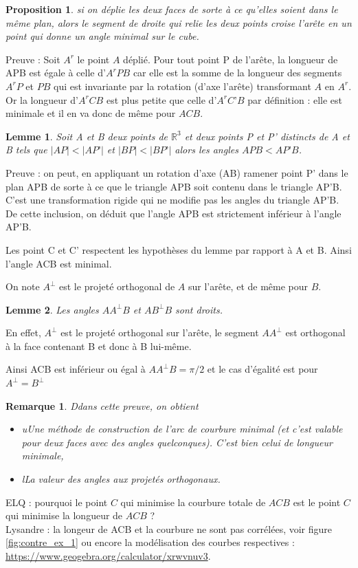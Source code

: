 \documentclass{article}
\newtheorem{prop}{Proposition}
\newtheorem{lem}{Lemme}
\newtheorem{rem}{Remarque}
\begin{document}
\begin{prop}
si on déplie les deux faces de sorte à ce qu’elles soient dans le même plan, alors le segment de droite qui relie les deux points croise l’arête en un point qui donne un angle minimal sur le cube.
\end{prop}
Preuve : 
Soit $A^r$ le point $A$ déplié. Pour tout point P de l’arête, la longueur de APB est égale à celle d’$A^rPB$ car elle est la somme de la longueur des segments $A^rP$ et $PB$ qui est invariante par la rotation (d’axe l’arête) transformant $A$ en $A^r$. Or la longueur d’$A^rCB$ est plus petite que celle d’$A^rC’B$ par définition : elle est minimale et il en va donc de même pour $ACB.$


\begin{lem}
Soit A et B deux points de $\mathbb{R}^3$ et deux points P et P’ distincts de A et B tels que $|AP|<|AP’|$ et $|BP|<|BP’|$ alors les angles $APB<AP’B$.
\end{lem}
Preuve : on peut, en appliquant un rotation d’axe (AB) ramener point P’ dans le plan APB de sorte à ce que le triangle APB soit contenu dans le triangle AP’B. C’est une transformation rigide qui ne modifie pas les angles du triangle AP’B. De cette inclusion, on déduit que l’angle APB est strictement inférieur à l’angle AP’B.  

Les point C et C’ respectent les hypothèses du lemme par rapport à A et B. Ainsi l’angle ACB est minimal. 

On note $A^\perp$ est le projeté orthogonal de $A$ sur l’arête, et de même pour $B$.
\begin{lem}
Les angles  $AA^\perp B$ et $AB^\perp B$ sont droits.
\end{lem}
En effet, $A^\perp$ est le projeté orthogonal sur l’arête, le segment $AA^\perp$ est orthogonal à la face contenant B et donc à B lui-même. 

Ainsi ACB est inférieur ou égal à $AA^\perp B=\pi/2$ et le cas d’égalité est pour $A^\perp =B^\perp $

\begin{rem}
Ddans cette preuve, on obtient 
\begin{itemize}
    \item uUne méthode de construction de l’arc de courbure minimal (et c’est valable pour deux faces avec des angles quelconques). C'est bien celui de longueur minimale,
    \item lLa valeur des angles aux projetés orthogonaux. 
\end{itemize}
\end{rem}
ELQ : pourquoi le point $C$ qui minimise la courbure totale de $ACB$ est le point $C$ qui minimise la longueur de $ACB$ ? \\
Lysandre : la longeur de ACB et la courbure ne sont pas corrélées, voir figure \ref{fig:contre_ex_1} ou encore la modélisation des courbes respectives : \url{https://www.geogebra.org/calculator/xrwvnuv3}.
\end{document}
